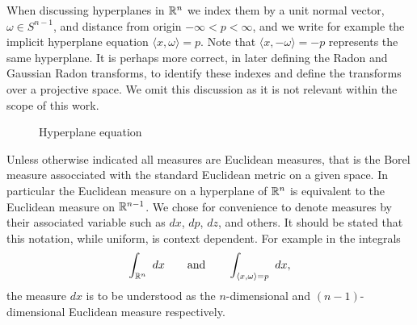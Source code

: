 \begin{notationpage}
When discussing hyperplanes in $\mathbb{R}^n$ we index them by a unit normal vector, $\omega \in S^{n-1}$, and distance from origin $-\infty < p < \infty$, and we write for example the implicit hyperplane equation $\langle x, \omega \rangle = p$. Note that $\langle x, -\omega \rangle = -p$ represents the same hyperplane. It is perhaps more correct, in later defining the Radon and Gaussian Radon transforms, to identify these indexes and define the transforms over a projective space. We omit this discussion as it is not relevant within the scope of this work.
\begin{figure}[h]
  \centering
  \caption{Hyperplane equation}\label{fig:HypEq}
\end{figure}

Unless otherwise indicated all measures are Euclidean measures, that is the Borel measure assocciated with the standard Euclidean metric on a given space. In particular the Euclidean measure on a hyperplane of $\mathbb{R}^n$ is equivalent to the Euclidean measure on $\mathbb{R}^{n-1}$. We chose for convenience to denote measures by their associated variable such as $dx$, $dp$, $dz$, and others. It should be stated that this notation, while uniform, is context dependent. For example in the integrals
\[
  \int_{\mathbb{R}^n}~dx \qquad \text{and} \qquad \int_{\langle x, \omega\rangle = p} ~dx,
\]
the measure $dx$ is to be understood as the $n$-dimensional and $(n-1)$-dimensional Euclidean measure respectively.


\end{notationpage}

